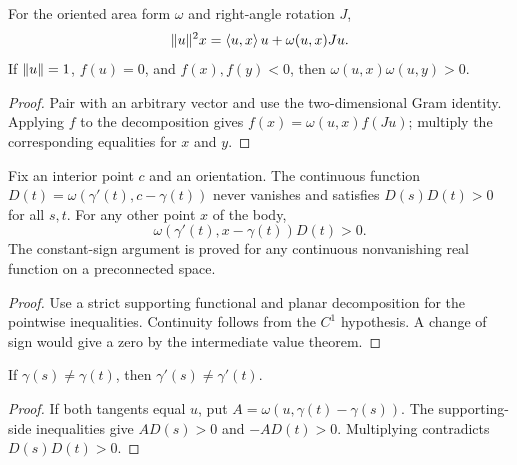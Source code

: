 \begin{lemma}
\label{lem:planar-decomposition}
\leanok
{}
For the oriented area form $\omega$ and right-angle rotation $J$,
\[
 \lVert u\rVert^2 x=\langle u,x\rangle\,u+\omega(u,x)Ju.
\]
If $\lVert u\rVert=1$, $f(u)=0$, and $f(x),f(y)<0$, then
$\omega(u,x)\omega(u,y)>0$.
\end{lemma}
\begin{proof}
\leanok
Pair with an arbitrary vector and use the two-dimensional Gram identity.
Applying $f$ to the decomposition gives $f(x)=\omega(u,x)f(Ju)$;
multiply the corresponding equalities for $x$ and $y$.
\end{proof}

\begin{lemma}
\label{lem:tangent-orientation}
\leanok
{}
Fix an interior point $c$ and an orientation. The continuous function
$D(t)=\omega(\gamma'(t),c-\gamma(t))$ never vanishes and satisfies
$D(s)D(t)>0$ for all $s,t$. For any other point $x$ of the body,
\[
 \omega(\gamma'(t),x-\gamma(t))D(t)>0.
\]
The constant-sign argument is proved for any continuous nonvanishing
real function on a preconnected space.
\end{lemma}
\begin{proof}
\leanok
Use a strict supporting functional and planar decomposition for the
pointwise inequalities. Continuity follows from the $C^1$ hypothesis.
A change of sign would give a zero by the intermediate value theorem.
\end{proof}

\begin{lemma}
\label{lem:distinct-tangents}
\leanok
{}
If $\gamma(s)\neq\gamma(t)$, then $\gamma'(s)\neq\gamma'(t)$.
\end{lemma}
\begin{proof}
\leanok
If both tangents equal $u$, put $A=\omega(u,\gamma(t)-\gamma(s))$.
The supporting-side inequalities give $A D(s)>0$ and $-A D(t)>0$.
Multiplying contradicts $D(s)D(t)>0$.
\end{proof}

